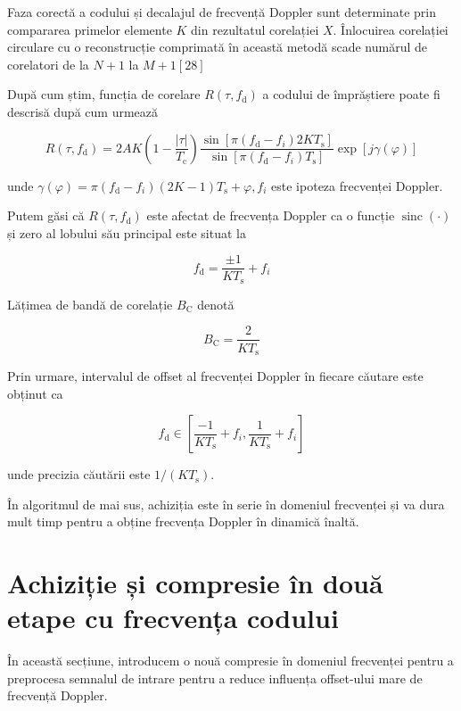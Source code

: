 \documentclass[10pt]{report}
\begin{document}
Faza corectă a codului și decalajul de frecvență Doppler sunt determinate prin compararea primelor elemente \(K\) din rezultatul corelației \(X\). Înlocuirea corelației circulare cu o reconstrucție comprimată în această metodă scade numărul de corelatori de la \(N+1\) la \(M+1[28]\)

După cum știm, funcția de corelare \(R\left(\tau, f_{\mathrm{d}}\right)\) a codului de împrăștiere poate fi descrisă după cum urmează


\begin{equation}
    R\left(\tau, f_{\mathrm{d}}\right)=2 A K\left(1-\frac{|\tau|}{T_{\mathrm{c}}}\right) \frac{ \sin \left[\pi\left(f_{\mathrm{d}}-f_{i}\right) 2 K T_{\mathrm{s}}\right]}{\sin \left[\pi\left (f_{\mathrm{d}}-f_{i}\right) T_{\mathrm{s}}\right]} \exp [j \gamma(\varphi)]
\end{equation}


unde \(\gamma(\varphi)=\pi\left(f_{\mathrm{d}}-f_{i}\right)(2 K-1) T_{\mathrm{s}}+\varphi, f_ {i}\) este ipoteza frecvenței Doppler.

Putem găsi că \(R\left(\tau, f_{\mathrm{d}}\right)\) este afectat de frecvența Doppler ca o funcție \(\operatorname{sinc}(\cdot)\) și zero al lobului său principal este situat la


\begin{equation}
    f_{\mathrm{d}}=\frac{ \pm 1}{K T_{\mathrm{s}}}+f_{i}
\end{equation}


Lățimea de bandă de corelație \(B_{\mathrm{C}}\) denotă


\begin{equation}
    B_{\mathrm{C}}=\frac{2}{K T_{\mathrm{s}}}
\end{equation}


Prin urmare, intervalul de offset al frecvenței Doppler în fiecare căutare este obținut ca


\begin{equation}
    f_{\mathrm{d}} \in\left[\frac{-1}{K T_{\mathrm{s}}}+f_{i}, \frac{1}{K T_{\mathrm{s} }}+f_{i}\right]
\end{equation}


unde precizia căutării este \(1 /\left(K T_{\mathrm{s}}\right)\).

În algoritmul de mai sus, achiziția este în serie în domeniul frecvenței și va dura mult timp pentru a obține frecvența Doppler în dinamică înaltă.

\section{Achiziție și compresie în două etape cu frecvența codului}
În această secțiune, introducem o nouă compresie în domeniul frecvenței pentru a preprocesa semnalul de intrare pentru a reduce influența offset-ului mare de frecvență Doppler.
\end{document}

